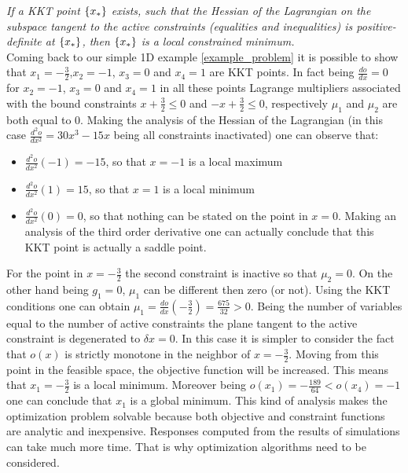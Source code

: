 \textit{ If a KKT point $\left\lbrace{x_*}\right \rbrace$ exists, such that the Hessian of the Lagrangian on the subspace tangent to the active constraints (equalities and inequalities) is positive-definite at $\left\lbrace{x_*}\right \rbrace$, then $\left\lbrace{x_*}\right \rbrace$ is a local constrained minimum.}\\
Coming back to our simple 1D example \eqref{example_problem} it is possible to show that $x_1=-\frac{3}{2}$,$x_2=-1$, $x_3=0$ and $x_4=1$ are KKT points. In fact being $\frac{do}{dx}=0$ for $x_2=-1$, $x_3=0$ and $x_4=1$ in all these points Lagrange multipliers associated with the bound constraints $x+\frac{3}{2}\leq 0$ and $-x+\frac{3}{2}\leq 0$, respectively $\mu_1$ and $\mu_2$ are both equal to 0.
Making the analysis of the Hessian of the Lagrangian (in this case $\frac{d^2 o}{dx^2}=30x^3-15x$ being all constraints inactivated) one can observe that: 
\begin{itemize}
\item $\frac{d^2 o}{dx^2}(-1)=-15$, so that $x=-1$ is a local maximum
\item $\frac{d^2 o}{dx^2}(1)=15$, so that $x=1$ is a local minimum
\item $\frac{d^2 o}{dx^2}(0)=0$, so that nothing can be stated on the point in $x=0$. Making an analysis of the third order derivative one can actually conclude that this KKT point is actually a saddle point.
\end{itemize}
For the point in $x=-\frac{3}{2}$ the second constraint is inactive so that $\mu_2=0$. On the other hand being $g_1=0$, $\mu_1$ can be different then zero (or not). Using the KKT conditions one can obtain $\mu_1=\frac{do}{dx}(-\frac{3}{2})=\frac{675}{32}>0$. Being the number of variables equal to the number of active constraints the plane tangent to the active constraint is degenerated to $\delta x=0$. In this case it is simpler to consider the fact that $o(x)$ is strictly monotone in the neighbor of $x=-\frac{3}{2}$. Moving from this point in the feasible space, the objective function will be increased.  This means that $x_1= -\frac{3}{2}$ is a local minimum. Moreover being $o(x_1)=-\frac{189}{64}< o(x_4)=-1$ one can conclude that $x_1$ is a global minimum. This kind of analysis makes the optimization problem solvable because both objective and constraint functions are analytic and inexpensive. Responses computed from the results of simulations can take much more time. That is why optimization algorithms need to be considered.
